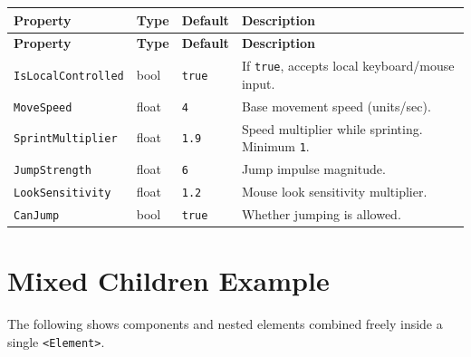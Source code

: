 \documentclass[11pt,a4paper]{article}
\begin{document}
\begin{longtable}{P{3.8cm} P{2cm} P{2.2cm} P{5.0cm}}
  \toprule
  \textbf{Property} & \textbf{Type} & \textbf{Default} & \textbf{Description} \\
  \midrule
  \endfirsthead
  \toprule
  \textbf{Property} & \textbf{Type} & \textbf{Default} & \textbf{Description} \\
  \midrule
  \endhead
  \texttt{IsLocalControlled} & bool & \texttt{true} &
    If \texttt{true}, accepts local keyboard/mouse input. \\
  \texttt{MoveSpeed} & float & \texttt{4} & Base movement speed (units/sec). \\
  \texttt{SprintMultiplier} & float & \texttt{1.9} &
    Speed multiplier while sprinting. Minimum \texttt{1}. \\
  \texttt{JumpStrength} & float & \texttt{6} & Jump impulse magnitude. \\
  \texttt{LookSensitivity} & float & \texttt{1.2} & Mouse look sensitivity multiplier. \\
  \texttt{CanJump} & bool & \texttt{true} & Whether jumping is allowed. \\
  \bottomrule
\end{longtable}

\section{Mixed Children Example}

The following shows components and nested elements combined freely inside a
single \texttt{<Element>}.
\end{document}
